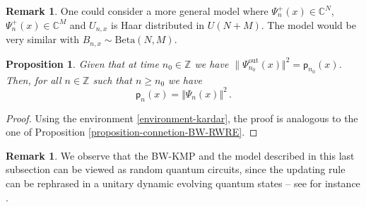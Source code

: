 \documentclass[a4paper,11pt,oneside,reqno]{amsart}
\newtheorem{proposition}[theorem]{Proposition}
\theoremstyle{definition}
\newtheorem{remark}[theorem]{Remark}
\newcommand{\C}{\ensuremath{\mathbb{C}}}
\renewcommand{\geq}{\geqslant}
\numberwithin{equation}{section}
\begin{document}
\begin{remark}\label{beta-waveModel}
	One could consider a more general model where $\Psi_n^+(x)\in \C^N$,  $\Psi_n^+(x)\in \C^M$ and $U_{n,x}$ is Haar distributed in $U(N+M)$. The model would be very similar with $B_{n,x}\sim \mathrm{Beta}(N,M)$. 
\end{remark}
\begin{proposition}
	Given that at time $n_{0}\in \mathbb{Z}$  we have $\lVert \Psi_{n_{0}}^{\text{out}}(x)\Vert^2 =\mathsf{p}_{n_{0}}(x)$. 
	Then, for all $n\in \mathbb{Z}$ such that $n\geq n_{0}$ we have 
	\begin{equation*}
		\mathsf{p}_n(x)=\Vert \Psi_{n}(x)\Vert^2\,.
	\end{equation*}
\end{proposition}
\begin{proof}
	Using the environment \eqref{environment-kardar}, the proof is analogous to the one of Proposition \ref{proposition-connetion-BW-RWRE}.
\end{proof}
\begin{remark}
	We observe that the BW-KMP and the model described in this last subsection can be viewed as random quantum circuits, since the updating rule can be rephrased in a unitary dynamic evolving quantum states -- see for instance \cite{nahum2018operator,fisher2023random}.
\end{remark}
\end{document}
